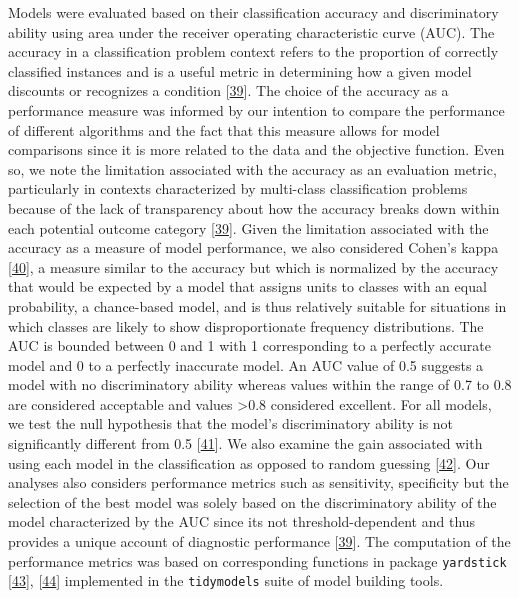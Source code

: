 \documentclass[
  10pt,
]{article}
\begin{document}
Models were evaluated based on their classification accuracy and discriminatory ability using area under the receiver operating characteristic curve (AUC). The accuracy in a classification problem context refers to the proportion of correctly classified instances and is a useful metric in determining how a given model discounts or recognizes a condition {[}\protect\hyperlink{ref-Metz1978}{39}{]}. The choice of the accuracy as a performance measure was informed by our intention to compare the performance of different algorithms and the fact that this measure allows for model comparisons since it is more related to the data and the objective function. Even so, we note the limitation associated with the accuracy as an evaluation metric, particularly in contexts characterized by multi-class classification problems because of the lack of transparency about how the accuracy breaks down within each potential outcome category {[}\protect\hyperlink{ref-Metz1978}{39}{]}. Given the limitation associated with the accuracy as a measure of model performance, we also considered Cohen's kappa {[}\protect\hyperlink{ref-Cohen1960}{40}{]}, a measure similar to the accuracy but which is normalized by the accuracy that would be expected by a model that assigns units to classes with an equal probability, a chance-based model, and is thus relatively suitable for situations in which classes are likely to show disproportionate frequency distributions. The AUC is bounded between 0 and 1 with 1 corresponding to a perfectly accurate model and 0 to a perfectly inaccurate model. An AUC value of 0.5 suggests a model with no discriminatory ability whereas values within the range of 0.7 to 0.8 are considered acceptable and values \textgreater0.8 considered excellent. For all models, we test the null hypothesis that the model's discriminatory ability is not significantly different from 0.5 {[}\protect\hyperlink{ref-Mandrekar2010}{41}{]}. We also examine the gain associated with using each model in the classification as opposed to random guessing {[}\protect\hyperlink{ref-Engelmann2021}{42}{]}. Our analyses also considers performance metrics such as sensitivity, specificity but the selection of the best model was solely based on the discriminatory ability of the model characterized by the AUC since its not threshold-dependent and thus provides a unique account of diagnostic performance {[}\protect\hyperlink{ref-Metz1978}{39}{]}. The computation of the performance metrics was based on corresponding functions in package \texttt{yardstick} {[}\protect\hyperlink{ref-yardstick2022}{43}{]}, {[}\protect\hyperlink{ref-Hand2001}{44}{]} implemented in the \texttt{tidymodels} suite of model building tools.
\end{document}
